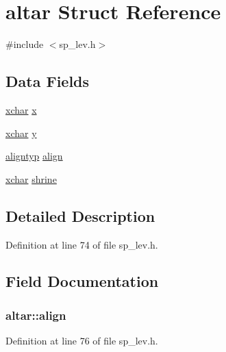 \hypertarget{structaltar}{\section{altar Struct Reference}
\label{structaltar}
}


{\ttfamily \#include $<$sp\+\_\+lev.\+h$>$}

\subsection*{Data Fields}
\begin{DoxyCompactItemize}
\item 
\hyperlink{global_8h_a2043b7d01ce89f4ee2fa6c345a752d32}{xchar} \hyperlink{structaltar_ab6398c7a80fc9af8b6b8a4276af9e916}{x}
\item 
\hyperlink{global_8h_a2043b7d01ce89f4ee2fa6c345a752d32}{xchar} \hyperlink{structaltar_a156ee63e1d9839d71f3407c83a03f872}{y}
\item 
\hyperlink{align_8h_a3e17b7a656899892e425fc89481aa2ab}{aligntyp} \hyperlink{structaltar_a93ebb60cd31f3d024f347577e68f15c8}{align}
\item 
\hyperlink{global_8h_a2043b7d01ce89f4ee2fa6c345a752d32}{xchar} \hyperlink{structaltar_a307b482c89f08c22966a37f2c88a0dbb}{shrine}
\end{DoxyCompactItemize}


\subsection{Detailed Description}


Definition at line 74 of file sp\+\_\+lev.\+h.



\subsection{Field Documentation}
\hypertarget{structaltar_a93ebb60cd31f3d024f347577e68f15c8}{
\subsubsection[{align}]{ altar\+::align}}\label{structaltar_a93ebb60cd31f3d024f347577e68f15c8}


Definition at line 76 of file sp\+\_\+lev.\+h.



